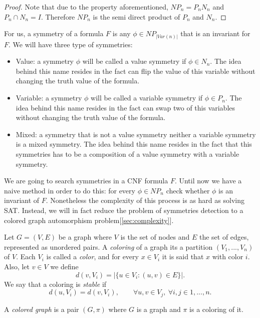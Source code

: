 \begin{proof}
Note that due to the property aforementioned, $NP_n = P_nN_n$ and $P_n\cap N_n = I$. Therefore $NP_n$ is the semi direct product of $P_n$ and $N_n$.
\end{proof}

For us, a symmetry of a formula $F$ is any $\phi\in NP_{|Var(n)|}$ that is an invariant for $F$. We will have three type of symmetries:
\begin{itemize}
\item Value: a symmetry $\phi$ will be called a value symmetry if $\phi \in N_n$. The idea behind this name resides in the fact can flip the value of this variable without changing the truth value of the formula.
\item Variable: a symmetry $\phi$ will be called a variable symmetry if $\phi \in P_n$. The idea behind this name resides in the fact can swap two of this variables without changing the truth value of the formula.
\item Mixed: a symmetry that is not a value symmetry neither a variable symmetry is a mixed symmetry. The idea behind this name resides in the fact that this symmetries has to be a composition of a value symmetry with a variable symmetry.
\end{itemize}





We are going to search symmetries in a CNF formula $F$. Until now we have a naive method in order to do this: for every $\phi \in NP_n$ check whether $\phi$ is an invariant of $F$. Nonetheless the complexity of this process is as hard as solving SAT. Instead, we will in fact reduce the problem of symmetries detection to a colored graph  automorphism problem[\ref{sec:complexity}].\\








\begin{definition}
  Let $G = (V,E)$ be a graph where $V$ is the set of nodes and $E$ the set of edges, represented as unordered pairs. A \emph{coloring} of a graph its a partition  $(V_1,...,V_n)$ of $V$. Each  $V_i$ is called a \emph{color}, and for every $x\in V_i$ it is said that $x$ with color $i$. Also, let $v\in V$ we define $$d(v, V_i) = |\{u \in V_i : (u,v)\in E\}|.$$
  We say that a coloring is \emph{stable} if
  $$d(u,V_i) = d(v,V_i), \qquad  \forall u,v \in V_j,\ \forall i,j \in 1,...,n.$$

  A \emph{colored graph} is a pair $(G,\pi)$ where $G$ is a graph and $\pi$ is a coloring of it.
\end{definition}


